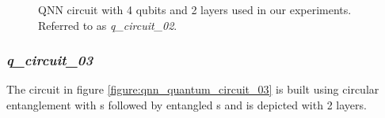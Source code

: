 \begin{figure}[!h]
	\centering
	\caption{QNN circuit with 4 qubits and 2 layers used in our experiments. Referred to as \textit{q\_circuit\_02}.}
	\label{figure:qnn_quantum_circuit_02}
\end{figure}


\subsubsection{\textit{q\_circuit\_03}}
\label{subsubsection:qnn_quantum_circuit_03}
The circuit in figure \ref{figure:qnn_quantum_circuit_03} is built using circular entanglement with \rygate s followed by entangled \czgate s and is depicted with 2 layers.

